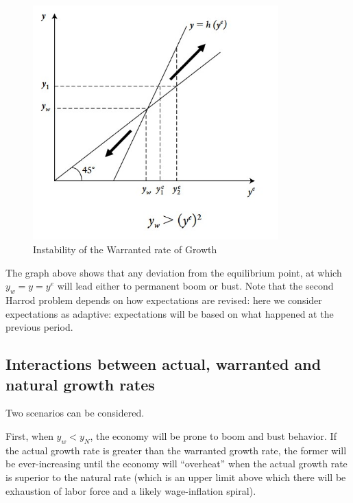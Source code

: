 \documentclass[
  letterpaper,
  DIV=11,
  numbers=noendperiod]{scrreprt}
\begin{document}
\begin{figure}

{\centering \includegraphics[width=3.72917in,height=\textheight]{images/harrod1.jpg}

}

\caption{Instability of the Warranted rate of Growth}

\end{figure}

The graph above shows that any deviation from the equilibrium point, at
which \(y_w = y = y^e\) will lead either to permanent boom or bust. Note
that the second Harrod problem depends on how expectations are revised:
here we consider expectations as adaptive: expectations will be based on
what happened at the previous period.

\hypertarget{interactions-between-actual-warranted-and-natural-growth-rates}{%
\subsection{Interactions between actual, warranted and natural growth
rates}\label{interactions-between-actual-warranted-and-natural-growth-rates}}

Two scenarios can be considered.

First, when \(y_w<y_N\), the economy will be prone to boom and bust
behavior. If the actual growth rate is greater than the warranted growth
rate, the former will be ever-increasing until the economy will
``overheat'' when the actual growth rate is superior to the natural rate
(which is an upper limit above which there will be exhaustion of labor
force and a likely wage-inflation spiral).
\end{document}
